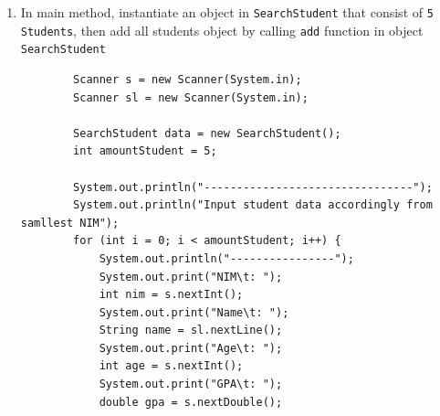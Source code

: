 \documentclass[12pt,titlepage]{article}
\begin{document}
\begin{enumerate}
\begin{verbatim}
            }
        }
    \end{verbatim}
    \item In main method, instantiate an object in \texttt{SearchStudent} that consist of \texttt{5 Students}, then add all students object by calling \texttt{add} function in object \texttt{SearchStudent}
    \begin{verbatim}
        Scanner s = new Scanner(System.in);
        Scanner sl = new Scanner(System.in);

        SearchStudent data = new SearchStudent();
        int amountStudent = 5;

        System.out.println("--------------------------------");
        System.out.println("Input student data accordingly from samllest NIM");
        for (int i = 0; i < amountStudent; i++) {
            System.out.println("----------------");
            System.out.print("NIM\t: ");
            int nim = s.nextInt();
            System.out.print("Name\t: ");
            String name = sl.nextLine();
            System.out.print("Age\t: ");
            int age = s.nextInt();
            System.out.print("GPA\t: ");
            double gpa = s.nextDouble();


\end{verbatim}
\end{enumerate}
\end{document}
